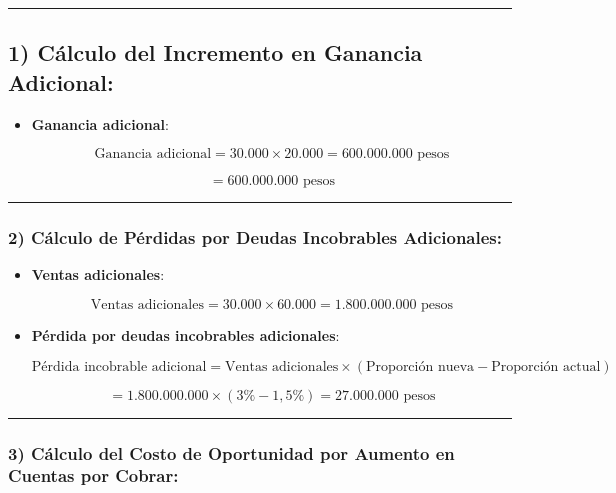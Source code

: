 \documentclass[
  letterpaper,
  DIV=11,
  numbers=noendperiod]{scrartcl}
\begin{document}
\begin{center}\rule{0.5\linewidth}{0.5pt}\end{center}

\subsection{1) Cálculo del Incremento en Ganancia
Adicional:}\label{cuxe1lculo-del-incremento-en-ganancia-adicional-1}

\begin{itemize}
\item
  \textbf{Ganancia adicional}:

  \[
  \text{Ganancia adicional} = 30.000 \times 20.000 = 600.000.000 \text{ pesos}
  \]

  \[
   = 600.000.000 \text{ pesos}
  \]
\end{itemize}

\begin{center}\rule{0.5\linewidth}{0.5pt}\end{center}

\subsubsection{2) Cálculo de Pérdidas por Deudas Incobrables
Adicionales:}\label{cuxe1lculo-de-puxe9rdidas-por-deudas-incobrables-adicionales}

\begin{itemize}
\item
  \textbf{Ventas adicionales}:

  \[
  \text{Ventas adicionales} = 30.000 \times 60.000 = 1.800.000.000 \text{ pesos}
  \]
\item
  \textbf{Pérdida por deudas incobrables adicionales}:

  \[
  \text{Pérdida incobrable adicional} = \text{Ventas adicionales} \times (\text{Proporción nueva} - \text{Proporción actual}) 
  \]

  \[
  = 1.800.000.000 \times (3\% - 1,5\%) = 27.000.000 \text{ pesos}
  \]
\end{itemize}

\begin{center}\rule{0.5\linewidth}{0.5pt}\end{center}

\subsubsection{3) Cálculo del Costo de Oportunidad por Aumento en
Cuentas por
Cobrar:}\label{cuxe1lculo-del-costo-de-oportunidad-por-aumento-en-cuentas-por-cobrar}
\end{document}
